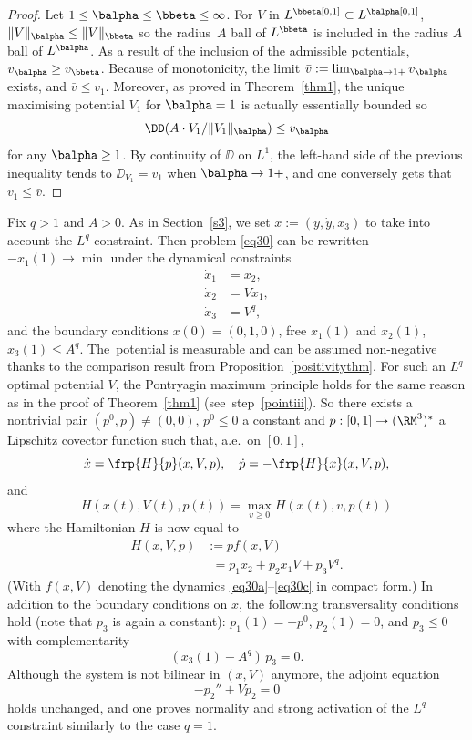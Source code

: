 \begin{proof} Let $1 \leq \balpha \leq \bbeta \leq \infty$.
For $V$ in $L^\bbeta[0,1] \subset L^\balpha[0,1]$, $\|V\|_\balpha \leq \|V\|_\bbeta$ so
the radius~$A$ ball of $L^\bbeta$ is included in the radius $A$ ball of $L^\balpha$.
As a result of the inclusion of the admissible potentials, $v_\balpha \geq v_\bbeta$.
Because of monotonicity, the limit $\bar{v}:=\lim_{\balpha \to 1+} v_\balpha$ exists,
and $\bar{v} \leq v_1$. Moreover, as proved in Theorem~\ref{thm1}, the unique
maximising potential $V_1$ for $\balpha=1$ is actually essentially bounded so
\[
\DD(A\cdot V_1/\|V_1\|_\balpha) \leq v_\balpha
\]
for any $\balpha \geq 1$. By continuity of $\DD$ on $L^1$, the left-hand side of the
previous inequality tends to $\DD_{V_1}=v_1$ when $\balpha \to 1+$, and one conversely
gets that $v_1 \leq \bar{v}$.\end{proof}

Fix $q > 1$ and $A>0$. As in Section~\ref{s3}, we set $x:=(y,\dot{y},x_3)$
to take into account the $L^q$ constraint.
Then problem \eqref{eq30} can be rewritten
$-x_1(1) \to \min$ under the dynamical constraints
\begin{align} \label{eq30a}
\dot{x}_1 &= x_2,\\
\dot{x}_2 &= Vx_1,\\
\dot{x}_3 &= V^q, \label{eq30c}
\end{align}
and the boundary conditions $x(0)=(0,1,0)$, free $x_1(1)$ and $x_2(1)$,
$x_3(1) \leq A^q$.
The~potential is measurable and can be assumed non-negative
thanks to the comparison result from Proposition~\ref{positivitythm}.
For such an $L^q$ optimal potential $V$, the Pontryagin maximum principle holds
for the same reason as in the proof of Theorem~\ref{thm1} (see~step~\eqref{pointiii}).
So there exists a nontrivial pair $(p^0,p) \neq (0,0)$, $p^0 \leq 0$ a constant and
$p:[0,1] \to (\RM^3)^*$ a Lipschitz covector function such that, a.e.\ on $[0,1]$,
\[
\dot{x}=\frp{H}{p}(x,V,p),\quad \dot{p}=-\frp{H}{x}(x,V,p),
\]
and
\[
H(x(t),V(t),p(t)) = \max_{v \geq 0} H(x(t),v,p(t))
\]
where the Hamiltonian $H$ is now equal to
\begin{align*}
H(x,V,p) &:= pf(x,V)\\
&\phantom{:}= p_1 x_2 + p_2 x_1 V + p_3 V^q.
\end{align*}
(With $f(x,V)$ denoting the dynamics \eqref{eq30a}--\eqref{eq30c} in compact form.)
In addition to the boundary conditions on $x$, the following transversality
conditions hold (note that $p_3$ is again a constant):
$p_1(1)=-p^0$, $p_2(1)=0$, and $p_3 \leq 0$ with complementarity
\[
(x_3(1)-A^q)\,p_3 = 0.
\]
Although the system is not bilinear in $(x,V)$ anymore, the adjoint equation
\begin{equation} \label{eq31}
-p_2''+V p_2 = 0
\end{equation}
holds unchanged, and one proves normality and strong activation of the $L^q$
constraint similarly to the case $q=1$.

